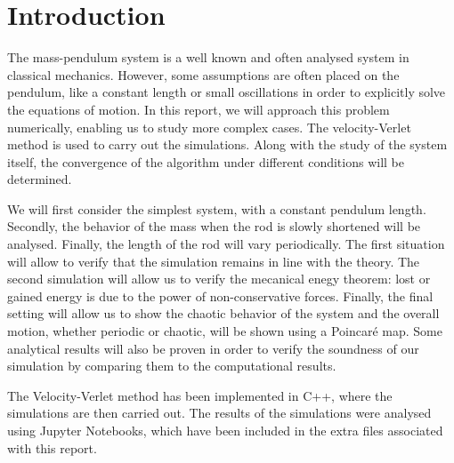 \section{Introduction}

The mass-pendulum system is a well known and often analysed system in classical mechanics. However, some assumptions are often placed on the pendulum, like a constant length or small oscillations in order to explicitly solve the equations of motion. In this report, we will approach this problem numerically, enabling us to study more complex cases. The velocity-Verlet method is used to carry out the simulations. Along with the study of the system itself, the convergence of the algorithm under different conditions will be determined.

We will first consider the simplest system, with a constant pendulum length. Secondly, the behavior of the mass when the rod is slowly shortened will be analysed. Finally, the length of the rod will vary periodically. The first situation will allow to verify that the simulation remains in line with the theory. The second simulation will allow us to verify the mecanical enegy theorem: lost or gained energy is due to the power of non-conservative forces. Finally, the final setting will allow us to show the chaotic behavior of the system and the overall motion, whether periodic or chaotic, will be shown using a Poincaré map. Some analytical results will also be proven in order to verify the soundness of our simulation by comparing them to the computational results.

The Velocity-Verlet method has been implemented in C++, where the simulations are then carried out. The results of the simulations were analysed using Jupyter Notebooks, which have been included in the extra files associated with this report.
